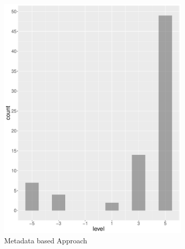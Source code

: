\begin{figure}
\begin{subfigure}[b]{0.4\textwidth}
        \includegraphics[width=\textwidth]{plots/finance/hist_level_ec}
        \caption{Metadata based Approach}
        \label{fig:hist_level_finance_ec}
    \end{subfigure}
    ~
    \begin{subfigure}[b]{0.4\textwidth}

\end{subfigure}
\end{figure}
